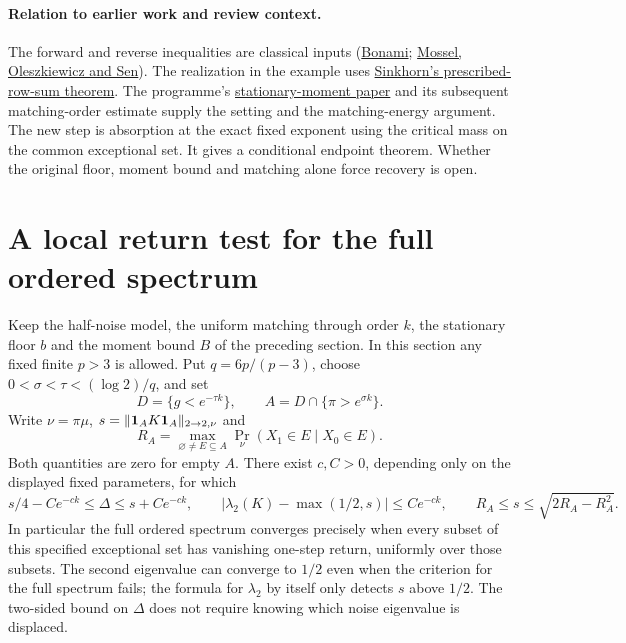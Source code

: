\paragraph{Relation to earlier work and review context.}
The forward and reverse inequalities are classical inputs
(\href{https://doi.org/10.5802/aif.357}{Bonami};
\href{https://arxiv.org/abs/1108.1210}{Mossel, Oleszkiewicz and Sen}).
The realization in the example uses
\href{https://www.cambridge.org/core/services/aop-cambridge-core/content/view/CDCA18916EAC355292A931C731AAC86C/S0008414X00040293a.pdf}{Sinkhorn's prescribed-row-sum theorem}.
The programme's
\href{https://airr.science/papers/ARR-2026-4T35VQ6MZB8F99F4/versions/v3/}{stationary-moment paper}
and its subsequent matching-order estimate supply the setting and the
matching-energy argument. The new step is absorption at the exact fixed
exponent using the critical mass on the common exceptional set. It gives
a conditional endpoint theorem. Whether the original floor, moment bound
and matching alone force recovery is open.


\section{A local return test for the full ordered spectrum}
\label{sec:local-return-test}

Keep the half-noise model, the uniform matching through order $k$, the
stationary floor $b$ and the moment bound $B$ of the preceding section.
In this section any fixed finite $p>3$ is allowed. Put $q=6p/(p-3)$,
choose $0<\sigma<\tau<(\log 2)/q$, and set
\[
 D=\{g<e^{-\tau k}\},\qquad A=D\cap\{\pi>e^{\sigma k}\}.
\]
Write $\nu=\pi\mu$, $s=\|{\bf1}_A K{\bf1}_A\|_{2\to2,\nu}$ and
\[
 R_A=\max_{\varnothing\ne E\subseteq A}
       {\Pr}_{\nu}(X_1\in E\mid X_0\in E).
\]
Both quantities are zero for empty $A$. There exist $c,C>0$, depending
only on the displayed fixed parameters, for which
\[
 s/4-Ce^{-ck}\le\Delta\le s+Ce^{-ck},\qquad
 |\lambda_2(K)-\max(1/2,s)|\le Ce^{-ck},\qquad
 R_A\le s\le\sqrt{2R_A-R_A^2}.                         \tag{LR1}
\]
In particular the full ordered spectrum converges precisely when every
subset of this specified exceptional set has vanishing one-step return,
uniformly over those subsets. The second eigenvalue can converge to $1/2$
even when the criterion for the full spectrum fails; the formula for
$\lambda_2$ by itself only detects $s$ above $1/2$. The two-sided bound
on $\Delta$ does not require knowing which noise eigenvalue is displaced.

